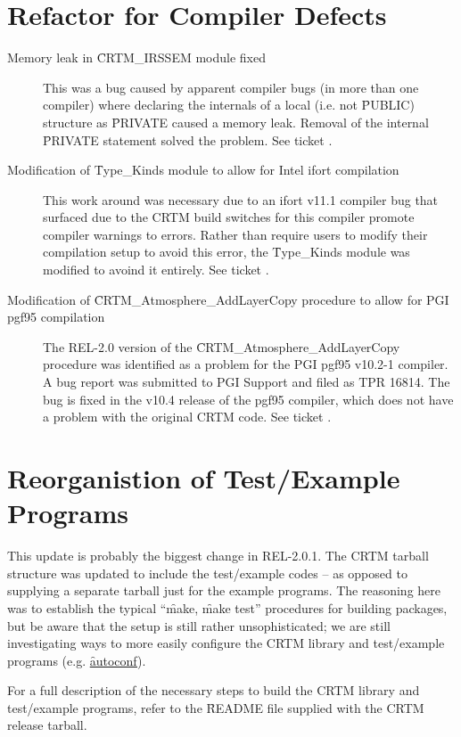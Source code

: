 \section*{Refactor for Compiler Defects}

\begin{description}

\item[Memory leak in \f{CRTM\_IRSSEM} module fixed] This was a bug caused by apparent compiler bugs (in more than one compiler) where declaring the internals of a local (i.e. not \f{PUBLIC}) structure as \f{PRIVATE} caused a memory leak. Removal of the internal \f{PRIVATE} statement solved the problem. See ticket .

\item[Modification of \f{Type\_Kinds} module to allow for Intel ifort compilation] This work around was necessary due to an ifort v11.1 compiler bug that surfaced due to the CRTM build switches for this compiler promote compiler warnings to errors. Rather than require users to modify their compilation setup to avoid this error, the \f{Type\_Kinds} module was modified to avoind it entirely. See ticket .

\item[Modification of \f{CRTM\_Atmosphere\_AddLayerCopy} procedure to allow for PGI pgf95 compilation] The REL-2.0 version of the \f{CRTM\_Atmosphere\_AddLayerCopy} procedure was identified as a problem for the PGI pgf95 v10.2-1 compiler. A bug report was submitted to PGI Support and filed as TPR 16814. The bug is fixed in the v10.4 release of the pgf95 compiler, which does not have a problem with the original CRTM code. See ticket .

\end{description}


\section*{Reorganistion of Test/Example Programs}

This update is probably the biggest change in REL-2.0.1. The CRTM tarball structure was updated to include the test/example codes -- as opposed to supplying a separate tarball just for the example programs. The reasoning here was to establish the typical ``\f{make}, \f{make test}'' procedures for building packages, but be aware that the setup is still rather unsophisticated; we are still investigating ways to more easily configure the CRTM library and test/example programs (e.g. \href{http://www.gnu.org/software/autoconf/}{\f{autoconf}}).

For a full description of the necessary steps to build the CRTM library and test/example programs, refer to the \f{README} file supplied with the CRTM release tarball.

